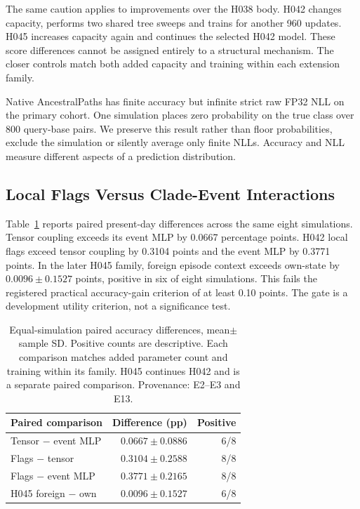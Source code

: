 \documentclass[letterpaper]{article}
\begin{document}
The same caution applies to improvements over the H038 body. H042 changes capacity, performs two shared tree sweeps and trains for another 960 updates. H045 increases capacity again and continues the selected H042 model. These score differences cannot be assigned entirely to a structural mechanism. The closer controls match both added capacity and training within each extension family.

Native AncestralPaths has finite accuracy but infinite strict raw FP32 NLL on the primary cohort. One simulation places zero probability on the true class over 800 query-base pairs. We preserve this result rather than floor probabilities, exclude the simulation or silently average only finite NLLs. Accuracy and NLL measure different aspects of a prediction distribution.

\subsection{Local Flags Versus Clade-Event Interactions}
Table~\ref{tab:paired} reports paired present-day differences across the same eight simulations. Tensor coupling exceeds its event MLP by 0.0667 percentage points. H042 local flags exceed tensor coupling by 0.3104 points and the event MLP by 0.3771 points. In the later H045 family, foreign episode context exceeds own-state by $0.0096\pm0.1527$ points, positive in six of eight simulations. This fails the registered practical accuracy-gain criterion of at least 0.10 points. The gate is a development utility criterion, not a significance test.

\begin{table}[t]
\centering
\small
\begin{tabular}{lrr}
\toprule
Paired comparison & Difference (pp) & Positive \\
\midrule
Tensor $-$ event MLP & $0.0667\pm0.0886$ & 6/8 \\
Flags $-$ tensor & $0.3104\pm0.2588$ & 8/8 \\
Flags $-$ event MLP & $0.3771\pm0.2165$ & 8/8 \\
H045 foreign $-$ own & $0.0096\pm0.1527$ & 6/8 \\
\bottomrule
\end{tabular}
\caption{Equal-simulation paired accuracy differences, mean$\pm$sample SD. Positive counts are descriptive. Each comparison matches added parameter count and training within its family. H045 continues H042 and is a separate paired comparison. Provenance: E2--E3 and E13.}
\label{tab:paired}
\end{table}
\end{document}
